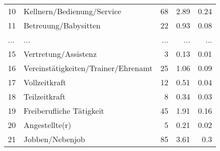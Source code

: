 \begin{longtable}{lXrrr}
        10 & \multicolumn{1}{X}{Kellnern/Bedienung/Service} & %
          \num{68} &
          \num[round-mode=places,round-precision=2]{2,89} &
          \num[round-mode=places,round-precision=2]{0,24} \\
        11 & \multicolumn{1}{X}{Betreuung/Babysitten} & %
          \num{22} &
          \num[round-mode=places,round-precision=2]{0,93} &
          \num[round-mode=places,round-precision=2]{0,08} \\
       ... & ... & ... & ... & ... \\
        15 & \multicolumn{1}{X}{Vertretung/Assistenz} & %
          \num{3} &
          \num[round-mode=places,round-precision=2]{0,13} &
          \num[round-mode=places,round-precision=2]{0,01} \\

        16 & \multicolumn{1}{X}{Vereinstätigkeiten/Trainer/Ehrenamt} & %
          \num{25} &
          \num[round-mode=places,round-precision=2]{1,06} &
          \num[round-mode=places,round-precision=2]{0,09} \\

        17 & \multicolumn{1}{X}{Vollzeitkraft} & %
          \num{12} &
          \num[round-mode=places,round-precision=2]{0,51} &
          \num[round-mode=places,round-precision=2]{0,04} \\

        18 & \multicolumn{1}{X}{Teilzeitkraft} & %
          \num{8} &
          \num[round-mode=places,round-precision=2]{0,34} &
          \num[round-mode=places,round-precision=2]{0,03} \\

        19 & \multicolumn{1}{X}{Freiberufliche Tätigkeit} & %
          \num{45} &
          \num[round-mode=places,round-precision=2]{1,91} &
          \num[round-mode=places,round-precision=2]{0,16} \\

        20 & \multicolumn{1}{X}{Angestellte(r)} & %
          \num{5} &
          \num[round-mode=places,round-precision=2]{0,21} &
          \num[round-mode=places,round-precision=2]{0,02} \\

        21 & \multicolumn{1}{X}{Jobben/Nebenjob} & %
          \num{85} &
          \num[round-mode=places,round-precision=2]{3,61} &
          \num[round-mode=places,round-precision=2]{0,3} \\


\end{longtable}
